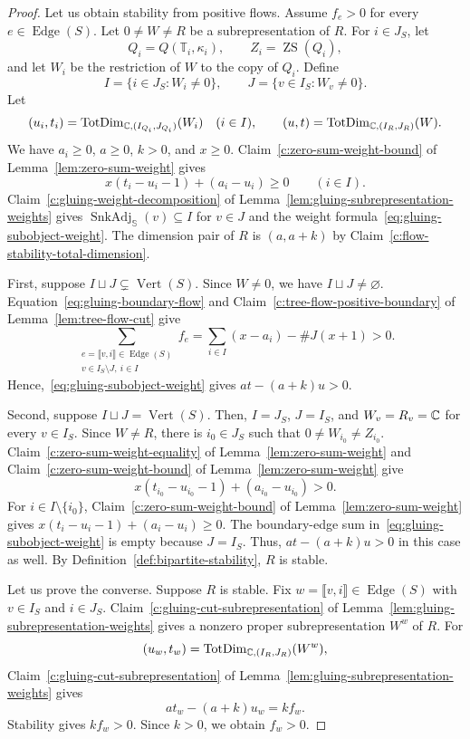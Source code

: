 \begin{proof}
 Let us obtain stability from positive flows.
Assume $f_e>0$ for every $e\in\operatorname{Edge}(S)$.
Let $0\ne W\ne R$ be a subrepresentation of $R$.
For $i\in J_S$, let
\[
 Q_i=Q(\mathbb T_i,\kappa_i),\qquad Z_i=\operatorname{ZS}(Q_i),
\]
and let $W_i$ be the restriction of $W$ to the copy of $Q_i$.
Define
\[
 I=\{i\in J_S:W_i\ne0\},\qquad
 J=\{v\in I_S:W_v\ne0\}.
\]
Let
\[
 (u_i,t_i)=\operatorname{TotDim}_{\mathbb C,(I_{Q_i},J_{Q_i})}(W_i)\quad(i\in I),
 \qquad
 (u,t)=\operatorname{TotDim}_{\mathbb C,(I_R,J_R)}(W).
\]
We have $a_i\ge0$, $a\ge0$, $k>0$, and $x\ge0$.
Claim~\ref{c:zero-sum-weight-bound} of Lemma~\ref{lem:zero-sum-weight} gives
\[
 x(t_i-u_i-1)+(a_i-u_i)\ge0\qquad(i\in I).
\]
Claim~\ref{c:gluing-weight-decomposition}
of Lemma~\ref{lem:gluing-subrepresentation-weights} gives
$\operatorname{SnkAdj}_{\mathbb S}(v)\subseteq I$ for $v\in J$ and
the weight formula~\eqref{eq:gluing-subobject-weight}.
The dimension pair of $R$ is $(a,a+k)$ by Claim~\ref{c:flow-stability-total-dimension}.

First, suppose $I\sqcup J\subsetneq\operatorname{Vert}(S)$.
Since $W\ne0$, we have $I\sqcup J\ne\varnothing$.
Equation~\eqref{eq:gluing-boundary-flow} and
Claim~\ref{c:tree-flow-positive-boundary} of Lemma~\ref{lem:tree-flow-cut} give
\[
 \sum_{\substack{e=\llbracket v,i\rrbracket\in\operatorname{Edge}(S)\\
                  v\in I_S\setminus J,\ i\in I}}f_e
 =\sum_{i\in I}(x-a_i)-\#J(x+1)>0.
\]
Hence,~\eqref{eq:gluing-subobject-weight} gives $at-(a+k)u>0$.

Second, suppose $I\sqcup J=\operatorname{Vert}(S)$.
Then, $I=J_S$, $J=I_S$, and $W_v=R_v=\mathbb C$ for every $v\in I_S$.
Since $W\ne R$, there is $i_0\in J_S$ such that $0\ne W_{i_0}\ne Z_{i_0}$.
Claim~\ref{c:zero-sum-weight-equality} of Lemma~\ref{lem:zero-sum-weight}
and Claim~\ref{c:zero-sum-weight-bound} of Lemma~\ref{lem:zero-sum-weight} give
\[
 x(t_{i_0}-u_{i_0}-1)+(a_{i_0}-u_{i_0})>0.
\]
For $i\in I\setminus\{i_0\}$, Claim~\ref{c:zero-sum-weight-bound} of Lemma~\ref{lem:zero-sum-weight} gives $x(t_i-u_i-1)+(a_i-u_i)\ge0$.
The boundary-edge sum in~\eqref{eq:gluing-subobject-weight} is empty because $J=I_S$.
Thus, $at-(a+k)u>0$ in this case as well.
By Definition~\ref{def:bipartite-stability}, $R$ is stable.

Let us prove the converse. Suppose $R$ is stable.
Fix $w=\llbracket v,i\rrbracket\in\operatorname{Edge}(S)$ with $v\in I_S$ and $i\in J_S$.
Claim~\ref{c:gluing-cut-subrepresentation}
of Lemma~\ref{lem:gluing-subrepresentation-weights}
gives a nonzero proper subrepresentation $W^w$ of $R$.
For
\[
 (u_w,t_w)=\operatorname{TotDim}_{\mathbb C,(I_R,J_R)}(W^w),
\]
Claim~\ref{c:gluing-cut-subrepresentation} of Lemma~\ref{lem:gluing-subrepresentation-weights} gives
\[
 at_w-(a+k)u_w=kf_w.
\]
Stability gives $kf_w>0$.
Since $k>0$, we obtain $f_w>0$.
\end{proof}

